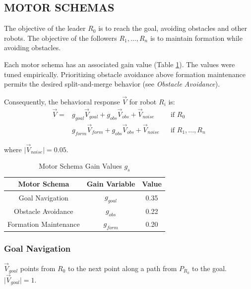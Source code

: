 \documentclass[letterpaper, 10 pt, conference]{ieeeconf}  %
\begin{document}
\subsection{MOTOR SCHEMAS}

The objective of the leader $R_0$ is to reach the goal, avoiding obstacles and other robots. The objective of the followers $R_1,...,R_n$ is to maintain formation while avoiding obstacles.

Each motor schema has an associated gain value (Table \ref{motor_schema_gs}). The values were tuned empirically. Prioritizing obstacle avoidance above formation maintenance permits the desired split-and-merge behavior (see \textit{Obstacle Avoidance}).

Consequently, the behavioral response $\vec{V}$ for robot $R_i$ is:
\begin{equation*}
\begin{aligned}
\vec{V} = & g_{goal} \vec{V}_{goal} + g_{obs} \vec{V}_{obs} + \vec{V}_{noise}    && \text{if $R_0$} \\
              & g_{form} \vec{V}_{form} + g_{obs} \vec{V}_{obs} + \vec{V}_{noise}   && \text{if $R_1,...,R_n$}
\end{aligned}
\end{equation*}

where $\lvert\vec{V}_{noise}\rvert = 0.05$.

\begin{table}[h]
\begin{center}
\begin{tabular}{|c|c|c|}
\hline
Motor Schema & Gain Variable & Value \\
\hline
Goal Navigation & $g_{goal}$ & 0.35 \\
Obstacle Avoidance & $g_{obs}$ & 0.22 \\
Formation Maintenance & $g_{form}$ & 0.20 \\
\hline
\end{tabular}
\end{center}
\caption{Motor Schema Gain Values $g_s$}
\label{motor_schema_gs}
\end{table}

\subsubsection*{Goal Navigation}

$\vec{V}_{goal}$ points from $R_0$ to the next point along a path from $P_{R_0}$ to the goal. $\vert \vec{V}_{goal} \rvert = 1$.
\end{document}
